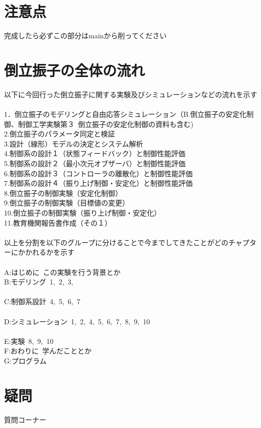 \section{注意点}
完成したら必ずこの部分はmainから削ってください

\section{倒立振子の全体の流れ}
以下に今回行った倒立振子に関する実験及びシミュレーションなどの流れを示す\\
\\
1．倒立振子のモデリングと自由応答シミュレーション（B.倒立振子の安定化制御、制御工学実験第３\ 倒立振子の安定化制御の資料も含む)\\
2.倒立振子のパラメータ同定と検証\\
3.設計（線形）モデルの決定とシステム解析\\
4.制御系の設計１（状態フィードバック）と制御性能評価\\
5.制御系の設計２（最小次元オブザーバ）と制御性能評価\\
6.制御系の設計３（コントローラの離散化）と制御性能評価\\
7.制御系の設計４（振り上げ制御・安定化）と制御性能評価\\
8.倒立振子の制御実験（安定化制御）\\
9.倒立振子の制御実験（目標値の変更）\\
10.倒立振子の制御実験（振り上げ制御・安定化）\\
11.教育機関報告書作成（その１）\\
\\
以上を分割を以下のグループに分けることで今までしてきたことがどのチャプターにかかれるかを示す\\
\\
A:はじめに\ この実験を行う背景とか\\
B:モデリング\ 1,\ 2,\ 3,\\
\\
C:制御系設計\ 4,\ 5,\ 6,\ 7\\
\\
D:シミュレーション\ 1,\ 2,\ 4,\ 5,\ 6,\ 7,\ 8,\ 9,\ 10\\
\\
E:実験\ 8,\ 9,\ 10\\
F:おわりに\ 学んだこととか\\
G:プログラム\ 

\section{疑問}
質問コーナー\\

